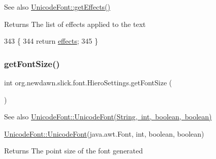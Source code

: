 \begin{DoxySeeAlso}{See also}
\mbox{\hyperlink{classorg_1_1newdawn_1_1slick_1_1_unicode_font_a939775feafa7099e8631da5ef44ee28c}{Unicode\+Font\+::get\+Effects()}}
\end{DoxySeeAlso}
\begin{DoxyReturn}{Returns}
The list of effects applied to the text 
\end{DoxyReturn}

\begin{DoxyCode}
343                              \{
344         \textcolor{keywordflow}{return} \mbox{\hyperlink{classorg_1_1newdawn_1_1slick_1_1font_1_1_hiero_settings_ad1134cfcc8c0f5d582f8abe54d7eeb80}{effects}};
345     \}
\end{DoxyCode}
\mbox{\label{classorg_1_1newdawn_1_1slick_1_1font_1_1_hiero_settings_a9a381d73a8b2d4f2427dbadecf972f65}} 
\subsubsection{\texorpdfstring{get\+Font\+Size()}{getFontSize()}}
{\footnotesize\ttfamily int org.\+newdawn.\+slick.\+font.\+Hiero\+Settings.\+get\+Font\+Size (\begin{DoxyParamCaption}{ }\end{DoxyParamCaption})\hspace{0.3cm}{\ttfamily [inline]}}

\begin{DoxySeeAlso}{See also}
\mbox{\hyperlink{classorg_1_1newdawn_1_1slick_1_1_unicode_font_a45cb814b2f8c0ec1e8dbc92c4594b33f}{Unicode\+Font\+::\+Unicode\+Font(\+String, int, boolean, boolean)}} 

\mbox{\hyperlink{classorg_1_1newdawn_1_1slick_1_1_unicode_font_acb84ea3da65e6ac55ce2283bc71e41cf}{Unicode\+Font\+::\+Unicode\+Font}}(java.\+awt.\+Font, int, boolean, boolean)
\end{DoxySeeAlso}
\begin{DoxyReturn}{Returns}
The point size of the font generated 
\end{DoxyReturn}

